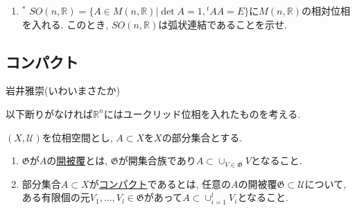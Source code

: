 \documentclass[dvipdfmx,a4paper,11pt]{article}
\newcommand{\R}{\mathbb{R}}
\theoremstyle{definition}
\begin{document}
\begin{enumerate}[label=\textbf{問}\ref*{sec-connected}.\arabic*]
\item  \label{son} $^{*}$ $SO(n, \R) = \{ A \in M(n,\R) | \det A =1, {}^{t}AA =E\}$に$M(n,\R)$の相対位相を入れる. このとき, $SO(n, \R)$は弧状連結であることを示せ.

 	\end{enumerate}
 
\newpage



\begin{center}
\section{コンパクト}%
\label{sec-compact}
\end{center}

\begin{flushright}
 岩井雅崇(いわいまさたか)
\end{flushright}

以下断りがなければ$\R^{n}$にはユークリッド位相を入れたものを考える. 

\begin{tcolorbox}[
   colback = white,
   colframe = green!35!black,
    fonttitle = \bfseries,
    breakable = true]
    $(X, \mathscr{U})$を位相空間とし, $A \subset X$を$X$の部分集合とする. 
    \begin{enumerate}
    \setlength{\parskip}{0cm} 
  \setlength{\itemsep}{0pt} 
    \item  $\mathfrak{G}$が$A$の\underline{開被覆}とは, $\mathfrak{G} $が開集合族であり$A \subset \cup_{V \in \mathfrak{G}}V$となること.
    \item 部分集合$A \subset X$が\underline{コンパクト}であるとは, 任意の$A$の開被覆$\mathfrak{G} \subset \mathscr{U}$について, ある有限個の元$V_1, \ldots, V_l \in \mathfrak{G}$があって$A \subset \cup_{i=1}^{l} V_i$となること.
    \end{enumerate}
 \end{tcolorbox}


\end{document}
